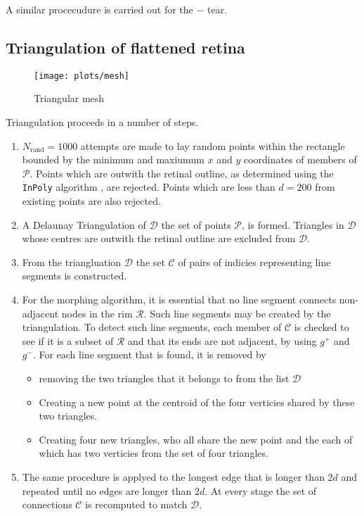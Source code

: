 \documentclass{article}
\begin{document}
A similar procecudure is carried out for the $-$ tear.


\subsection{Triangulation of flattened retina}
\label{fold-sphere:sec:triang-flatt-retina}

\begin{figure}[tp]
  \centering
  \texttt{[image: plots/mesh]}
  \caption{Triangular mesh}
  \label{fold-sphere:fig:mesh}
\end{figure}

Triangulation proceeds in a number of steps. 
\begin{enumerate}
\item $N_\mathrm{rand}=1000$ attempts are made to lay random points
  within the rectangle bounded by the minimum and maxiumum $x$ and $y$
  coordinates of members of $\mathcal{P}$.  Points which are outwith
  the retinal outline, as determined using the \texttt{InPoly}
  algorithm \citep{ORou98comp}, are rejected. Points which are less
  than $d=200$ from existing points are also rejected.
\item A Delaunay Triangulation of $\mathcal{D}$ the set of points
  $\mathcal{P}$, is formed. Triangles in $\mathcal{D}$ whose centres
  are outwith the retinal outline are excluded from $\mathcal{D}$.
\item From the triangluation $\mathcal{D}$ the set $\mathcal{C}$ of pairs of
  indicies representing line segments is constructed.
\item For the morphing algorithm, it is essential that no line segment
  connects non-adjacent nodes in the rim $\mathcal{R}$. Such line
  segments may be created by the triangulation. To detect such line
  segments, each member of $\mathcal{C}$ is checked to see if it is a
  subset of $\mathcal{R}$ and that its ends are not adjacent, by
  using $g^+$ and $g^-$. For each line segment that is found, it is
  removed by
  \begin{itemize}
  \item removing the two triangles that it belongs to from the list
    $\mathcal{D}$
  \item Creating a new point at the centroid of the four verticies
    shared by these two triangles.
  \item Creating four new triangles, who all share the new point and
    the each of which has two verticies from the set of four
    triangles.
  \end{itemize}
\item The same procedure is applyed to the longest edge that is longer
  than $2d$ and repeated until no edges are longer than $2d$. At every
  stage the set of connections $\mathcal{C}$ is recomputed to match
  $\mathcal{D}$.
\end{enumerate}
\end{document}
